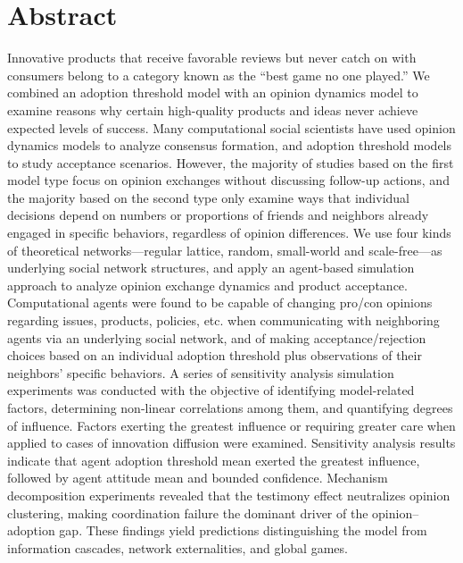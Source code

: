 \documentclass[10pt,letterpaper]{article}
\begin{document}
\section*{Abstract}
Innovative products that receive favorable reviews but never catch on with consumers belong to a category known as the ``best game no one played.'' We combined an adoption threshold model with an opinion dynamics model to examine reasons why certain high-quality products and ideas never achieve expected levels of success. Many computational social scientists have used opinion dynamics models to analyze consensus formation, and adoption threshold models to study acceptance scenarios. However, the majority of studies based on the first model type focus on opinion exchanges without discussing follow-up actions, and the majority based on the second type only examine ways that individual decisions depend on numbers or proportions of friends and neighbors already engaged in specific behaviors, regardless of opinion differences. We use four kinds of theoretical networks---regular lattice, random, small-world and scale-free---as underlying social network structures, and apply an agent-based simulation approach to analyze opinion exchange dynamics and product acceptance. Computational agents were found to be capable of changing pro/con opinions regarding issues, products, policies, etc. when communicating with neighboring agents via an underlying social network, and of making acceptance/rejection choices based on an individual adoption threshold plus observations of their neighbors' specific behaviors. A series of sensitivity analysis simulation experiments was conducted with the objective of identifying model-related factors, determining non-linear correlations among them, and quantifying degrees of influence. Factors exerting the greatest influence or requiring greater care when applied to cases of innovation diffusion were examined. Sensitivity analysis results indicate that agent adoption threshold mean exerted the greatest influence, followed by agent attitude mean and bounded confidence. Mechanism decomposition experiments revealed that the testimony effect neutralizes opinion clustering, making coordination failure the dominant driver of the opinion--adoption gap. These findings yield predictions distinguishing the model from information cascades, network externalities, and global games.


\linenumbers
\end{document}
